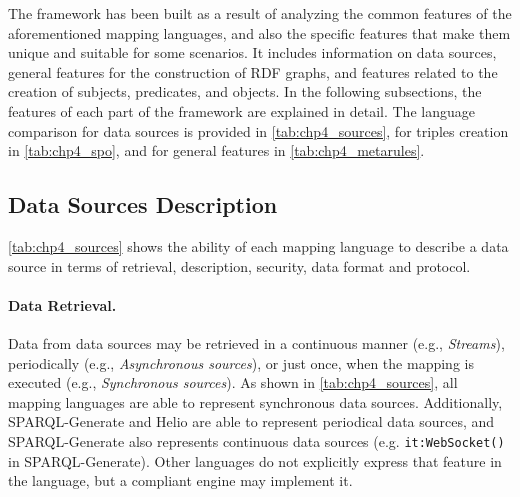 The framework has been built as a result of analyzing the common features of the aforementioned mapping languages, and also the specific features that make them unique and suitable for some scenarios. It includes information on data sources, general features for the construction of RDF graphs, and features related to the creation of subjects, predicates, and objects. In the following subsections, the features of each part of the framework are explained in detail. The language comparison for data sources is provided in \cref{tab:chp4_sources}, for triples creation in \cref{tab:chp4_spo}, and for general features in \cref{tab:chp4_metarules}. 





\subsection{Data Sources Description}


\cref{tab:chp4_sources} shows the ability of each mapping language to describe a data source in terms of retrieval, description, security, data format and protocol. 


\noindent\paragraph{\textbf{Data Retrieval.}} Data from data sources may be retrieved in a continuous manner (e.g., \textit{Streams}),  periodically (e.g., \textit{Asynchronous sources}), or just once, when the mapping is executed (e.g., \textit{Synchronous sources}). As shown in \cref{tab:chp4_sources}, all mapping languages are able to represent synchronous data sources. Additionally, SPARQL-Generate and Helio are able to represent periodical data sources, and SPARQL-Generate also represents continuous data sources (e.g. \texttt{it:WebSocket()} in SPARQL-Generate). Other languages do not explicitly express that feature in the language, but a compliant engine may implement it.

